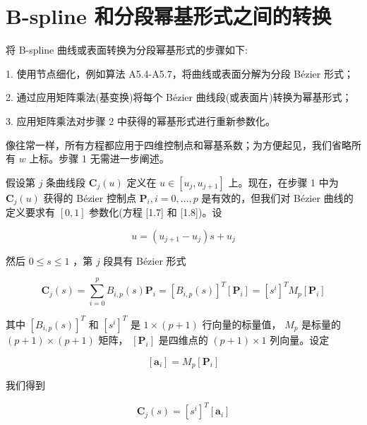 \documentclass[../main.tex]{subfiles}
\begin{document}
\section{B-spline 和分段幂基形式之间的转换}

将 B-spline 曲线或表面转换为分段幂基形式的步骤如下:

1. 使用节点细化，例如算法 A5.4-A5.7，将曲线或表面分解为分段 Bézier 形式；

2. 通过应用矩阵乘法(基变换)将每个 Bézier 曲线段(或表面片)转换为幂基形式；

3. 应用矩阵乘法对步骤 2 中获得的幂基形式进行重新参数化。

像往常一样，所有方程都应用于四维控制点和幂基系数；为方便起见，我们省略所有 \(w\) 上标。步骤 1 无需进一步阐述。

假设第 \(j\) 条曲线段 \({\mathbf{C}}_{j}\left( u\right)\) 定义在 \(u \in  \left\lbrack  {{u}_{j},{u}_{j + 1}}\right\rbrack\) 上。现在，在步骤 1 中为 \({\mathbf{C}}_{j}\left( u\right)\) 获得的 Bézier 控制点 \({\mathbf{P}}_{i},i = 0,\ldots ,p\) 是有效的，但我们对 Bézier 曲线的定义要求有 \(\left\lbrack  {0,1}\right\rbrack\) 参数化(方程 [1.7] 和 [1.8])。设

\[
u = \left( {{u}_{j + 1} - {u}_{j}}\right) s + {u}_{j} \tag{6.75}
\]

然后 \(0 \leq  s \leq  1\) ，第 \(j\) 段具有 Bézier 形式

\[
{\mathbf{C}}_{j}\left( s\right)  = \mathop{\sum }\limits_{{i = 0}}^{p}{B}_{i,p}\left( s\right) {\mathbf{P}}_{i} = {\left\lbrack  {B}_{i,p}\left( s\right) \right\rbrack  }^{T}\left\lbrack  {\mathbf{P}}_{i}\right\rbrack   = {\left\lbrack  {s}^{i}\right\rbrack  }^{T}{M}_{p}\left\lbrack  {\mathbf{P}}_{i}\right\rbrack   \tag{6.76}
\]

其中 \({\left\lbrack  {B}_{i,p}\left( s\right) \right\rbrack  }^{T}\) 和 \({\left\lbrack  {s}^{i}\right\rbrack  }^{T}\) 是 \(1 \times  \left( {p + 1}\right)\) 行向量的标量值， \({M}_{p}\) 是标量的 \(\left( {p + 1}\right)  \times  \left( {p + 1}\right)\) 矩阵， \(\left\lbrack  {\mathbf{P}}_{i}\right\rbrack\) 是四维点的 \(\left( {p + 1}\right)  \times  1\) 列向量。设定

\[
\left\lbrack  {\mathbf{a}}_{i}\right\rbrack   = {M}_{p}\left\lbrack  {\mathbf{P}}_{i}\right\rbrack   \tag{6.77}
\]

我们得到

\[
{\mathbf{C}}_{j}\left( s\right)  = {\left\lbrack  {s}^{i}\right\rbrack  }^{T}\left\lbrack  {\mathbf{a}}_{i}\right\rbrack   \tag{6.78}
\]
\end{document}
